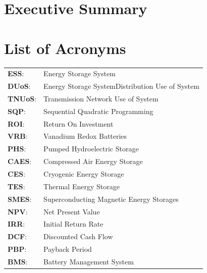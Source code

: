 \documentclass[fontsize=9.5pt]{extarticle}
\numberwithin{figure}{section} %
\begin{document}
\newpage


\section*{Executive Summary}\label{ExecSummary}

\newpage

\tableofcontents


\newpage
{}
\listoffigures
{}
\listoftables
{}
\section*{List of Acronyms}\label{acronyms}
\begin{tabular}{p{1cm}p{12cm}}
\textbf{ESS}:& Energy Storage System \\
\textbf{DUoS}:& Energy Storage SystemDistribution Use of System\\
\textbf{TNUoS}:& Transmission Network Use of System\\
\textbf{SQP}:& Sequential Quadratic Programming\\
\textbf{ROI}:& Return On Investment\\
\textbf{VRB}:& Vanadium Redox Batteries\\
\textbf{PHS}:& Pumped Hydroelectric Storage\\
\textbf{CAES}:& Compressed Air Energy Storage\\
\textbf{CES}:& Cryogenic Energy Storage\\
\textbf{TES}:& Thermal Energy Storage\\
\textbf{SMES}:& Superconducting Magnetic Energy Storages\\
\textbf{NPV}:& Net Present Value\\
\textbf{IRR}:& Initial Return Rate\\
\textbf{DCF}:& Discounted Cash Flow\\
\textbf{PBP}:& Payback Period\\
\textbf{BMS}:& Battery Management System\\
\end{tabular}
\end{document}
